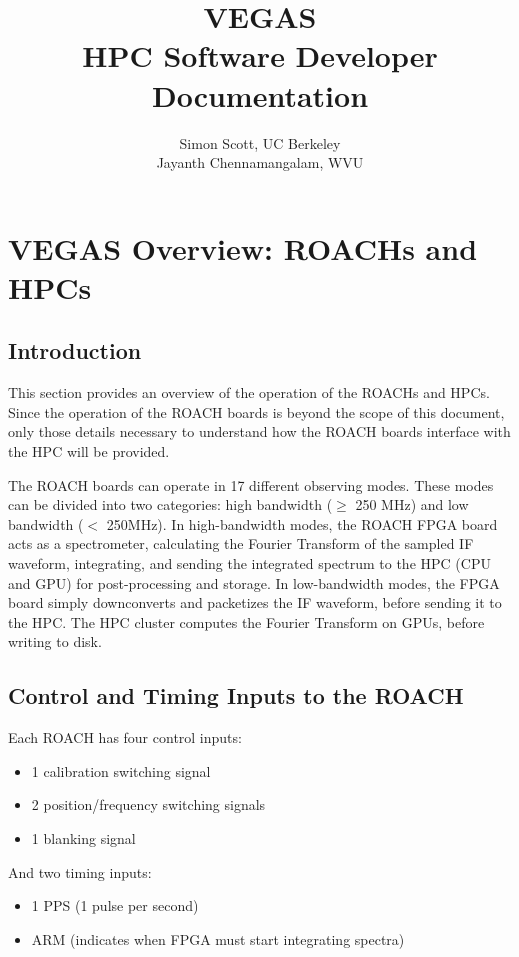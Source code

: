 \documentclass[11pt]{article} %
\title{VEGAS \\ \Large HPC Software Developer Documentation}
\author{Simon Scott, UC Berkeley\\Jayanth Chennamangalam, WVU}
\begin{document}
\maketitle
\parskip 7.2pt

\tableofcontents
\clearpage

\section{VEGAS Overview: ROACHs and HPCs}

\subsection{Introduction}

This section provides an overview of the operation of the ROACHs and HPCs. Since the operation of the ROACH boards is beyond the scope of this document, only those details necessary to understand how the ROACH boards interface with the HPC will be provided.

The ROACH boards can operate in 17 different observing modes. These modes can be divided into two categories: high bandwidth ($\ge$ 250 MHz) and low bandwidth ($<$ 250MHz). In high-bandwidth modes, the ROACH FPGA board acts as a spectrometer, calculating the Fourier Transform of the sampled IF waveform, integrating, and sending the integrated spectrum to the HPC (CPU and GPU) for post-processing and storage. In low-bandwidth modes, the FPGA board simply downconverts and packetizes the IF waveform, before sending it to the HPC. The HPC cluster computes the Fourier Transform on GPUs, before writing to disk.

\subsection{Control and Timing Inputs to the ROACH}

Each ROACH has four control inputs:
\begin{itemize}
\item 1 calibration switching signal
\item 2 position/frequency switching signals
\item 1 blanking signal
\end{itemize}
And two timing inputs:
\begin{itemize}
\item 1 PPS (1 pulse per second)
\item ARM (indicates when FPGA must start integrating spectra)
\end{itemize}
\end{document}
